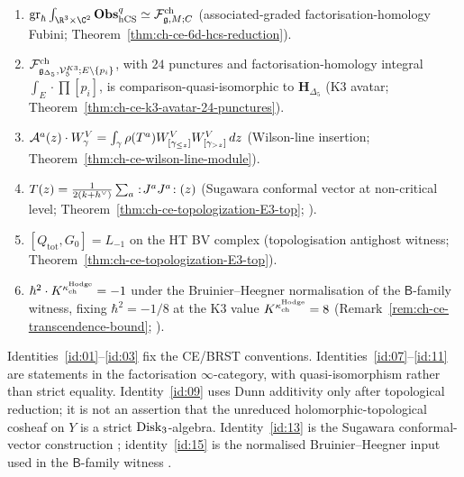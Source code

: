 \begin{enumerate}[label=\textup{(I\arabic*)},ref=I\arabic*]
Theorem~\ref{thm:ch-ce-disk3-algebra}; \cite[Thm.\,4.4.1]{CG17}).
\item\label{id:10}
$\operatorname{gr}_\hbar\int_{\R^3\times\C^2}\Fobs^q_{\hCS}
\simeq\cF^{\mathrm{ch}}_{\fg,M;C}$
(associated-graded factorisation-homology Fubini;
Theorem~\ref{thm:ch-ce-6d-hcs-reduction}).
\item\label{id:11}
$\mathcal{F}^{\mathrm{ch}}_{\mathfrak{g}_{\Delta_5},\mathcal{V}^{K3}_5; E\setminus\{p_i\}}$,
with $24$ punctures and factorisation-homology integral
$\int_E\cdot\prod[p_i]$, is comparison-quasi-isomorphic to
$\mathbf H_{\Delta_5}$
(K3 avatar; Theorem~\ref{thm:ch-ce-k3-avatar-24-punctures}).
\item\label{id:12}
$\mathcal{A}^a(z)\cdot W^V_\gamma = \int_\gamma\rho(T^a)W^V_{[\gamma_{\le z}]}
W^V_{[\gamma_{>z}]}\,dz$
(Wilson-line insertion; Theorem~\ref{thm:ch-ce-wilson-line-module}).
\item\label{id:13}
$T(z) = \tfrac{1}{2(k+h^\vee)}\sum_a:\!J^aJ^a\!:(z)$
(Sugawara conformal vector at non-critical level;
Theorem~\ref{thm:ch-ce-topologization-E3-top};
\cite[Prop.\,5.1]{FrenkelBenZvi2004}).
\item\label{id:14}
$[Q_{\mathrm{tot}},G_0]=L_{-1}$ on the HT BV complex
(topologisation antighost witness;
Theorem~\ref{thm:ch-ce-topologization-E3-top}).
\item\label{id:15}
$\hbar^2\cdot K^{\kappa_{\mathrm{ch}}^{\mathrm{Hodge}}} = -1$ under the
Bruinier--Heegner normalisation of the $\mathsf{B}$-family witness,
fixing $\hbar^2 = -1/8$ at the K3 value $K^{\kappa_{\mathrm{ch}}^{\mathrm{Hodge}}} = 8$
(Remark~\ref{rem:ch-ce-transcendence-bound};
\cite{Bruinier2002}).
\end{enumerate}

\begin{remark}
\label{rem:ch-ce-identity-proof-sources}
%
Identities~\eqref{id:01}--\eqref{id:03} fix the CE/BRST
conventions. Identities~\eqref{id:07}--\eqref{id:11} are statements in
the factorisation $\infty$-category, with quasi-isomorphism rather than
strict equality. Identity~\eqref{id:09} uses Dunn additivity only after
topological reduction; it is not an assertion that the unreduced
holomorphic-topological cosheaf on $Y$ is a strict $\mathrm{Disk}_3$-algebra.
Identity~\eqref{id:13} is the Sugawara conformal-vector construction
\cite[Prop.\,5.1]{FrenkelBenZvi2004}; identity~\eqref{id:15} is the
normalised Bruinier--Heegner input used in the \(\mathsf{B}\)-family
witness \cite{Bruinier2002}.
\end{remark}

